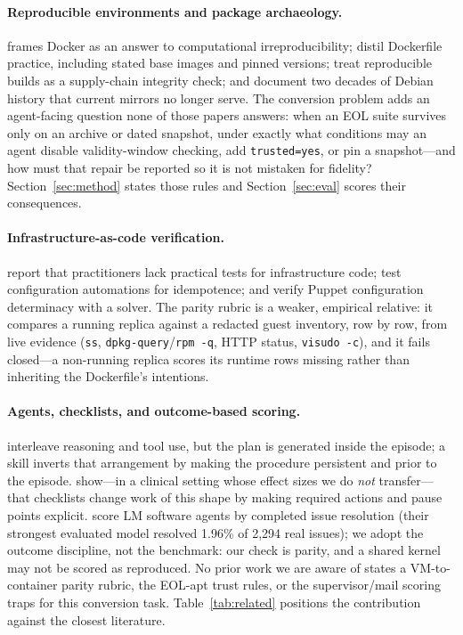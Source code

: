 \documentclass[3p,twocolumn,authoryear]{elsarticle}
\begin{document}
\paragraph{Reproducible environments and package archaeology.}
\citet{boettiger2015} frames Docker as an answer to computational
irreproducibility; \citet{nust2020} distil Dockerfile practice,
including stated base images and pinned versions; \citet{lamb2022}
treat reproducible builds as a supply-chain integrity check; and
\citet{caneill2017} document two decades of Debian history that current
mirrors no longer serve. The conversion problem adds an agent-facing
question none of those papers answers: when an EOL suite survives only
on an archive or dated snapshot, under exactly what conditions may an
agent disable validity-window checking, add \texttt{trusted=yes}, or
pin a snapshot---and how must that repair be reported so it is not
mistaken for fidelity? Section~\ref{sec:method} states those rules and
Section~\ref{sec:eval} scores their consequences.

\paragraph{Infrastructure-as-code verification.}
\citet{guerriero2019} report that practitioners lack practical tests
for infrastructure code; \citet{hummer2013} test configuration
automations for idempotence; and \citet{shambaugh2016} verify Puppet
configuration determinacy with a solver. The parity rubric is a weaker,
empirical relative: it compares a running replica against a redacted
guest inventory, row by row, from live evidence (\texttt{ss},
\texttt{dpkg-query}/\texttt{rpm -q}, HTTP status, \texttt{visudo -c}),
and it fails closed---a non-running replica scores its runtime rows
missing rather than inheriting the Dockerfile's intentions.

\paragraph{Agents, checklists, and outcome-based scoring.}
\citet{yao2023} interleave reasoning and tool use, but the plan is
generated inside the episode; a skill inverts that arrangement by
making the procedure persistent and prior to the episode.
\citet{haynes2009} show---in a clinical setting whose effect sizes we
do \emph{not} transfer---that checklists change work of this shape by
making required actions and pause points explicit. \citet{jimenez2024}
score LM software agents by completed issue resolution (their strongest
evaluated model resolved 1.96\% of 2,294 real issues); we adopt the
outcome discipline, not the benchmark: our check is parity, and a
shared kernel may not be scored as reproduced. No prior work we are
aware of states a VM-to-container parity rubric, the EOL-apt trust
rules, or the supervisor/mail scoring traps for this conversion task.
Table~\ref{tab:related} positions the contribution against the closest
literature.
\end{document}
